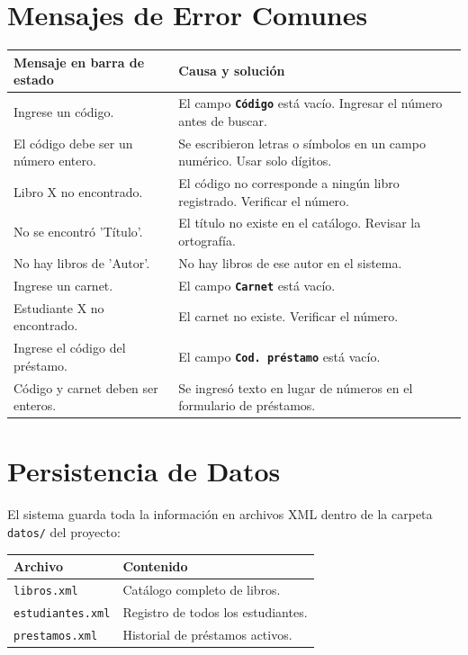 \documentclass[12pt, a4paper]{article}
\newcommand{\campo}[1]{\texttt{\textbf{#1}}}
\begin{document}
\section{Mensajes de Error Comunes}

\begin{center}
  \begin{tabularx}{\textwidth}{>{\ttfamily\small}p{5.6cm} X}
    \toprule
    \textbf{Mensaje en barra de estado} & \textbf{Causa y solución} \\
    \midrule
    Ingrese un código. &
      El campo \campo{Código} está vacío. Ingresar el número antes de buscar. \\[4pt]
    El código debe ser un número entero. &
      Se escribieron letras o símbolos en un campo numérico. Usar solo dígitos. \\[4pt]
    Libro X no encontrado. &
      El código no corresponde a ningún libro registrado. Verificar el número. \\[4pt]
    No se encontró 'Título'. &
      El título no existe en el catálogo. Revisar la ortografía. \\[4pt]
    No hay libros de 'Autor'. &
      No hay libros de ese autor en el sistema. \\[4pt]
    Ingrese un carnet. &
      El campo \campo{Carnet} está vacío. \\[4pt]
    Estudiante X no encontrado. &
      El carnet no existe. Verificar el número. \\[4pt]
    Ingrese el código del préstamo. &
      El campo \campo{Cod. préstamo} está vacío. \\[4pt]
    Código y carnet deben ser enteros. &
      Se ingresó texto en lugar de números en el formulario de préstamos. \\
    \bottomrule
  \end{tabularx}
\end{center}

\section{Persistencia de Datos}

El sistema guarda toda la información en archivos XML
dentro de la carpeta \texttt{datos/} del proyecto:

\begin{center}
  \begin{tabular}{ll}
    \toprule
    \textbf{Archivo}         & \textbf{Contenido} \\
    \midrule
    \texttt{libros.xml}      & Catálogo completo de libros. \\
    \texttt{estudiantes.xml} & Registro de todos los estudiantes. \\
    \texttt{prestamos.xml}   & Historial de préstamos activos. \\
    \bottomrule
  \end{tabular}
\end{center}
\end{document}
